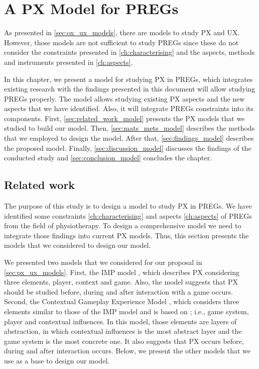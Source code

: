 \chapter{A PX Model for \acp{PREG}}
\label{ch:model}
As presented in \autoref{sec:ox_ux_models}, there are models to study \ac{PX} and \ac{UX}. However, those models are not sufficient to study \acp{PREG} since these do not consider the constraints presented in \autoref{ch:characterising} and the aspects, methods and instruments presented in \autoref{ch:aspects}.

In this chapter, we present a model for studying \ac{PX} in \acp{PREG}, which integrates existing research with the findings presented in this document will allow studying \acp{PREG} properly. The model allows studying existing \ac{PX} aspects and the new aspects that we have identified. Also, it will integrate \acp{PREG} constraints into its components. First, \autoref{sec:related_work_model} presents the \ac{PX} models that we studied to build our model. Then, \autoref{sec:mats_mets_model} describes the methods that we employed to design the model. After that, \autoref{sec:findings_model} describes the proposed model. Finally, \autoref{sec:discussion_model} discusses the findings of the conducted study and \autoref{sec:conclusion_model} concludes the chapter.

\section{Related work} %
\label{sec:related_work_model}
The purpose of this study is to design a model to study \ac{PX} in \acp{PREG}. We have identified some constraints \autoref{ch:characterising} and aspects \autoref{ch:aspects} of \acp{PREG} from the field of physiotherapy. To design a comprehensive model we need to integrate those findings into current \ac{PX} models. Thus, this section presents the models that we considered to design our model.

We presented two models that we considered for our proposal in \autoref{sec:px_ux_models}. First, the \ac{IMP} model \autocite{Elson2014}, which describes \ac{PX} considering three elements, player, context and game. Also, the model suggests that \ac{PX} should be studied before, during and after interaction with a game occurs. Second, the Contextual Gameplay Experience Model \autocite{Engl2013}, which considers three elements similar to those of the \ac{IMP} model and is based on \autocite{Nackea2,Nacked}; i.e., game system, player and contextual influences. In this model, those elements are layers of abstraction, in which contextual influences is the most abstract layer and the game system is the most concrete one. It also suggests that \ac{PX} occurs before, during and after interaction occurs. Below, we present the other models that we use as a base to design our model.

